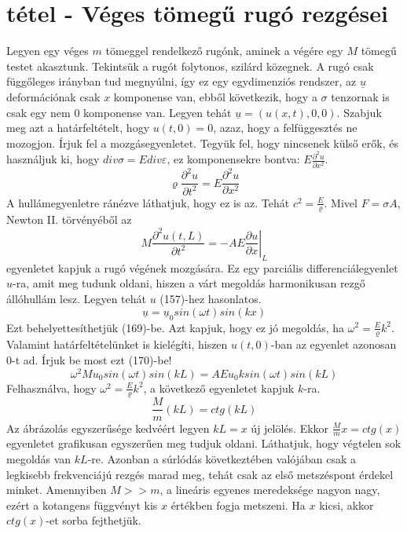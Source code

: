 \documentclass[a4paper,12pt]{article}
\begin{document}
\section{tétel - Véges tömegű rugó rezgései}
Legyen egy véges $m$ tömeggel rendelkező rugónk, aminek a végére egy $M$ tömegű testet akasztunk. Tekintsük a rugót folytonos, szilárd közegnek. A rugó csak függőleges irányban tud megnyúlni, így ez egy egydimenziós rendszer, az $\underline{u}$ deformációnak csak $x$ komponense van, ebből következik, hogy a $\sigma$ tenzornak is csak egy nem 0 komponense van.
Legyen tehát $\underline{u}=(u(x,t),0,0)$. Szabjuk meg azt a határfeltételt, hogy $u(t,0)=0$, azaz, hogy a felfüggesztés ne mozogjon. Írjuk fel a mozgásegyenletet. Tegyük fel, hogy nincsenek külső erők, és használjuk ki, hogy $div\sigma=Ediv\varepsilon$, ez komponensekre bontva: $E\frac{\partial^2u}{\partial x^2}$.
\begin{equation}
\varrho\frac{\partial^2 u}{\partial t^2}=E\frac{\partial^2u}{\partial x^2}
\end{equation}
A hullámegyenletre ránézve láthatjuk, hogy ez is az. Tehát $c^2=\frac{E}{\varrho}$. Mivel $F=\sigma A$, Newton II. törvényéből az
\begin{equation}
M\frac{\partial^2u(t,L)}{\partial t^2}=-AE\left.\frac{\partial u}{\partial x}\right|_L
\end{equation}
egyenletet kapjuk a rugó végének mozgására. Ez egy parciális differenciálegyenlet $u$-ra, amit meg tudunk oldani, hiszen a várt megoldás harmonikusan rezgő állóhullám lesz. Legyen tehát $u$ (157)-hez hasonlatos.
\begin{equation}
\underline{u}=\underline{u}_0sin(\omega t)sin(kx)
\end{equation}
Ezt behelyettesíthetjük (169)-be. Azt kapjuk, hogy ez jó megoldás, ha $\omega^2=\frac{E}{\varrho}k^2$. Valamint határfeltételünket is kielégíti, hiszen $u(t,0)$-ban az egyenlet azonosan 0-t ad. Írjuk be most ezt (170)-be!
\begin{equation}
\omega^2Mu_0sin(\omega t)sin(kL)=AEu_0ksin(\omega t)sin(kL)
\end{equation}
Felhasználva, hogy $\omega^2=\frac{E}{\varrho}k^2$, a következő egyenletet kapjuk $k$-ra.
\begin{equation}
\frac{M}{m}(kL)=ctg(kL)
\end{equation}
Az ábrázolás egyszerűsége kedvéért legyen $kL=x$ új jelölés. Ekkor $\frac{M}{m}x=ctg(x)$ egyenletet grafikusan egyszerűen meg tudjuk oldani. Láthatjuk, hogy végtelen sok megoldás van $kL$-re. Azonban a súrlódás következtében valójában csak a legkisebb frekvenciájú rezgés marad meg, tehát csak az első metszéspont érdekel minket. Amennyiben $M>>m$, a lineáris egyenes meredeksége nagyon nagy, ezért a kotangens függvényt kis $x$ értékben fogja metszeni. Ha $x$ kicsi, akkor $ctg(x)$-et sorba fejthetjük.
\end{document}
